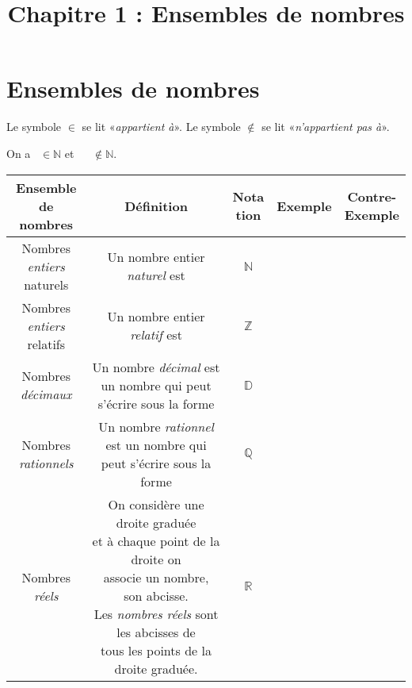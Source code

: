 \documentclass[11pt]{article}
\title{Chapitre 1 : Ensembles de nombres}
\date{}
\author{}
\begin{document}
\maketitle\thispagestyle{fancy}

\section{Ensembles de nombres}
\begin{notation}
  Le symbole $\in$ se lit «\emph{appartient à}». Le symbole $\notin$ se lit
  «\emph{n'appartient pas à}».
\end{notation}
\begin{exemple}
  On a $\phantom5\in\mathbb{N}$ et $\phantom{-1}\notin\mathbb{N}$.
\end{exemple}
\noindent
\begin{center}
\begin{tabular}{|c|c|c|c|c|}
  \hline
  \makecell{\textbf{Ensemble de}\\\textbf{nombres}} & \textbf{Définition} &
  \makecell{\textbf{Nota}\\\textbf{tion}} & \textbf{Exemple} &
  \makecell{\textbf{Contre-}\\\textbf{Exemple}}\\
  \hline
  \makecell{Nombres \emph{entiers}\\naturels} & \makecell{Un nombre entier \emph{naturel}
  est \phantom{un nombre}\\\phantom{entier positif ou nul.}} & $\mathbb{N}$ & & \\
  \hline
  \makecell{Nombres \emph{entiers}\\relatifs} & \makecell{Un nombre entier
    \emph{relatif} est \phantom{un nombre}\\\phantom{entier positif, négatif ou
    nul.}} &
    $\mathbb{Z}$ & & \\
  \hline
  \makecell{Nombres \\\emph{décimaux}} & \makecell{Un nombre \emph{décimal} est
  un nombre\\qui peut s'écrire sous la forme
  \phantom{$\frac{a}{10^k}$}\\\phantom{où
    $a\in\mathbb{Z}$ et $k\in\mathbb{N}$}} & $\mathbb{D}$ & & \\
  \hline
  \makecell{Nombres \\\emph{rationnels}} & \makecell{Un nombre \emph{rationnel} est
  un nombre\\qui peut s'écrire sous la forme \phantom{$\frac{p}{q}$}\\\phantom{où $p\in\mathbb{Z}$,
  $q\in\mathbb{N}$, $q\neq0$}} & $\mathbb{Q}$ & &\\
  \hline
  \makecell{Nombres \\\emph{réels}} & \makecell{On considère une droite
    graduée\\ et à chaque point de la droite on\\associe un nombre, son
    abcisse.\\
    Les \emph{nombres réels} sont les abcisses de\\tous les points de la droite
  graduée.} &
  $\mathbb{R}$
  & & \\
  \hline
\end{tabular}


\end{center}
\end{document}
